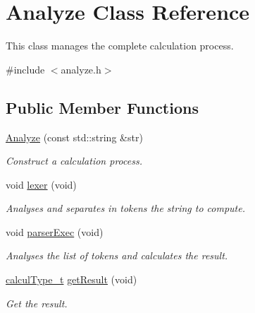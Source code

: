 \hypertarget{class_analyze}{}\section{Analyze Class Reference}
\label{class_analyze}


This class manages the complete calculation process.  




{\ttfamily \#include $<$analyze.\+h$>$}

\subsection*{Public Member Functions}
\begin{DoxyCompactItemize}
\item 
\hyperlink{class_analyze_a373e5e79d15401c429b980f819ce76b3}{Analyze} (const std\+::string \&str)
\begin{DoxyCompactList}\small\item\em Construct a calculation process. \end{DoxyCompactList}\item 
\hypertarget{class_analyze_a1090a6b9655c4770707d65ee8ebc124a}{}void \hyperlink{class_analyze_a1090a6b9655c4770707d65ee8ebc124a}{lexer} (void)\label{class_analyze_a1090a6b9655c4770707d65ee8ebc124a}

\begin{DoxyCompactList}\small\item\em Analyses and separates in tokens the string to compute. \end{DoxyCompactList}\item 
\hypertarget{class_analyze_ae0c00996ea3ce2e87f6cdda0c8df7065}{}void \hyperlink{class_analyze_ae0c00996ea3ce2e87f6cdda0c8df7065}{parser\+Exec} (void)\label{class_analyze_ae0c00996ea3ce2e87f6cdda0c8df7065}

\begin{DoxyCompactList}\small\item\em Analyses the list of tokens and calculates the result. \end{DoxyCompactList}\item 
\hypertarget{class_analyze_a20765fccf3b534b55ee65bd79ae25a83}{}\hyperlink{mpfr_interface_8h_a16492006127cd422340be2441c22c14b}{calcul\+Type\+\_\+t} \hyperlink{class_analyze_a20765fccf3b534b55ee65bd79ae25a83}{get\+Result} (void)\label{class_analyze_a20765fccf3b534b55ee65bd79ae25a83}

\begin{DoxyCompactList}\small\item\em Get the result. \end{DoxyCompactList}\end{DoxyCompactItemize}
